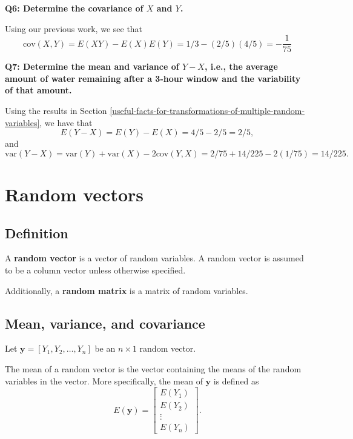 \documentclass[
]{book}
\theoremstyle{definition}
\theoremstyle{definition}
\theoremstyle{definition}
\theoremstyle{definition}
\theoremstyle{remark}
\begin{document}
\textbf{Q6: Determine the covariance of \(X\) and \(Y\).}

Using our previous work, we see that
\[
\mathrm{cov}(X,Y)=E(XY) - E(X)E(Y)=1/3-(2/5)(4/5)=-\frac{1}{75}
\]

\textbf{Q7: Determine the mean and variance of \(Y-X\), i.e., the average amount of water remaining after a 3-hour window and the variability of that amount.}

Using the results in Section \ref{useful-facts-for-transformations-of-multiple-random-variables}, we have that
\[E(Y-X)=E(Y)-E(X)=4/5-2/5=2/5,\]
and
\[
\mathrm{var}(Y-X)=\mathrm{var}(Y)+\mathrm{var}(X)-2\mathrm{cov}(Y,X)=
2/75+14/225-2(1/75)=14/225.
\]

\hypertarget{random-vectors}{%
\section{Random vectors}\label{random-vectors}}

\hypertarget{definition}{%
\subsection{Definition}\label{definition}}

A \textbf{random vector} is a vector of random variables. A random vector is assumed to be a column vector unless otherwise specified.

Additionally, a \textbf{random matrix} is a matrix of random variables.

\hypertarget{mean-variance-and-covariance}{%
\subsection{Mean, variance, and covariance}\label{mean-variance-and-covariance}}

Let \(\mathbf{y}=[Y_1,Y_2,\dots,Y_n]\) be an \(n\times1\) random vector.

The mean of a random vector is the vector containing the means of the random variables in the vector. More specifically, the mean of \(\mathbf{y}\) is defined as
\[
E(\mathbf{y})=\begin{bmatrix}E(Y_1)\\E(Y_2)\\\vdots\\E(Y_n)\end{bmatrix}.
\]
\end{document}
